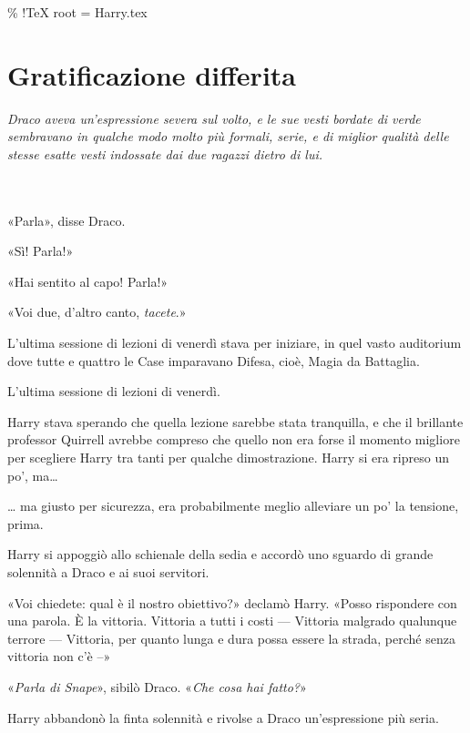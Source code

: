 \% !TeX root = Harry.tex



\chapter{Gratificazione differita}

\label{capitolo:19}



\emph{Draco aveva un’espressione severa sul volto, e le sue vesti bordate di verde sembravano in qualche modo molto più formali, serie, e di miglior qualità delle stesse esatte vesti indossate dai due ragazzi dietro di lui.}



~\\

~\\



«Parla», disse Draco.

«Sì! Parla!»

«Hai sentito al capo! Parla!»

«Voi due, d’altro canto, \textit{tacete}.»

L’ultima sessione di lezioni di venerdì stava per iniziare, in quel vasto auditorium dove tutte e quattro le Case imparavano Difesa, cioè, Magia da Battaglia.

L’ultima sessione di lezioni di venerdì.

Harry stava sperando che quella lezione sarebbe stata tranquilla, e che il brillante professor Quirrell avrebbe compreso che quello non era forse il momento migliore per scegliere Harry tra tanti per qualche dimostrazione. Harry si era ripreso un po’, ma…

… ma giusto per sicurezza, era probabilmente meglio alleviare un po’ la tensione, prima.

Harry si appoggiò allo schienale della sedia e accordò uno sguardo di grande solennità a Draco e ai suoi servitori.

«Voi chiedete: qual è il nostro obiettivo?» declamò Harry. «Posso rispondere con una parola. È la vittoria. Vittoria a tutti i costi — Vittoria malgrado qualunque terrore — Vittoria, per quanto lunga e dura possa essere la strada, perché senza vittoria non c’è –»

«\textit{Parla di Snape}», sibilò Draco. «\textit{Che cosa hai fatto?}»

Harry abbandonò la finta solennità e rivolse a Draco un’espressione più seria.

